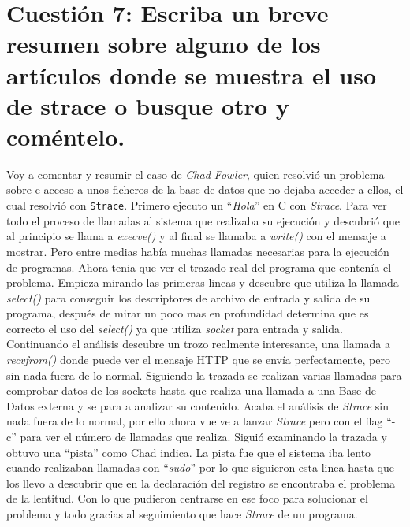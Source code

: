 \section{Cuestión 7: Escriba un breve resumen sobre alguno de los artículos donde se muestra el uso de strace o busque otro y coméntelo.}
Voy a comentar y resumir el caso de \textit{Chad Fowler}, quien resolvió un problema sobre e acceso a unos ficheros de 
la base de datos que no dejaba acceder a ellos, el cual resolvió con
 \texttt{Strace}. Primero ejecuto un ``\textit{Hola}'' en C con \textit{Strace}.
Para ver todo el proceso de llamadas al sistema que realizaba su ejecución
y descubrió que al principio se llama a \textit{execve()} y al final se
llamaba a \textit{write()} con el mensaje a mostrar. Pero entre medias 
había muchas llamadas necesarias para la ejecución de programas. Ahora 
tenia que ver el trazado real del programa que contenía el problema.
Empieza mirando las primeras lineas y descubre que utiliza la llamada
\textit{select()} para conseguir los descriptores de archivo de entrada
y salida de su programa, después de mirar un poco mas en profundidad 
determina que es correcto el uso del \textit{select()} ya que utiliza 
\textit{socket} para entrada y salida. Continuando el análisis descubre
un trozo realmente interesante, una llamada a \textit{recvfrom()} donde
puede ver el mensaje HTTP que se envía perfectamente, pero sin nada fuera
de lo normal. Siguiendo la trazada se realizan varias llamadas para comprobar
 datos de los sockets hasta que realiza una llamada a una Base de Datos
 externa y se para a analizar su contenido. 
  Acaba el análisis de \textit{Strace} 
 sin nada fuera de lo normal, por ello ahora vuelve a lanzar \textit{Strace}
 pero con el flag ``-c'' para ver el número de llamadas que realiza.
 Siguió examinando la trazada y obtuvo una ``pista'' como Chad indica. La 
 pista fue que el sistema iba lento cuando realizaban llamadas con ``\textit{sudo}'' por lo que siguieron esta linea hasta que los llevo a descubrir
 que en la declaración del registro se encontraba el problema de la lentitud.
 Con lo que pudieron centrarse en ese foco para solucionar el problema y 
 todo gracias al seguimiento que hace \textit{Strace} de un programa.
 



